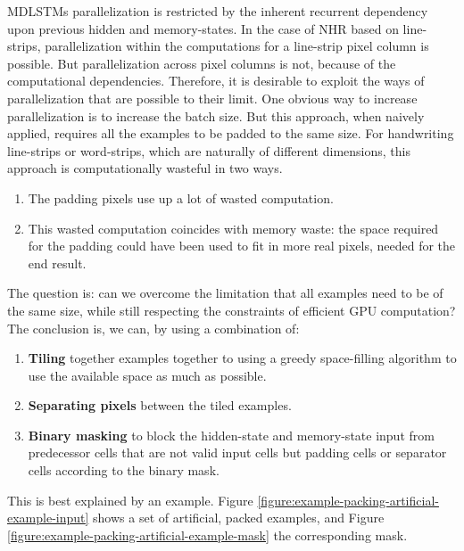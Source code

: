 \documentclass[conference]{IEEEtran}
\renewcommand{\ac}[1]{\gls{#1}}
\renewcommand{\acp}[1]{\glspl{#1}}
\begin{document}
\acp{MDLSTM} parallelization is restricted by the inherent recurrent dependency 
upon previous hidden and memory-states.
In the case of \ac{NHR} based on line-strips, parallelization 
within the computations for a line-strip pixel column is possible. But parallelization 
across pixel columns is not, because of the computational dependencies.
Therefore, it is desirable to exploit the ways of parallelization that are possible to their limit. 
One obvious way to increase parallelization is to increase the batch size.
But this approach, when naively applied, requires all the examples to be 
padded to the same size. For handwriting line-strips or word-strips, which 
are naturally of different dimensions, this approach is computationally 
wasteful in two ways. 
\begin{enumerate}
\item The padding pixels use up a lot of wasted computation. 
\item This  wasted computation coincides with memory waste: 
the space required for the padding could have been used to fit in more real pixels, 
needed for the end result.    
\end{enumerate}

The question is: can we overcome the limitation that all examples need to be of the 
same size, while still respecting the constraints of efficient GPU computation? 
The conclusion is, we can, by using a combination of:

\begin{enumerate}
\item \textbf{Tiling} together examples together to using a greedy space-filling algorithm  to use 
the available space as much as possible.
\item \textbf{Separating pixels} between the tiled examples.
\item \textbf{Binary masking} to block the hidden-state and memory-state input from predecessor cells 
that are not valid input cells but padding cells or separator cells according to the binary mask.    
\end{enumerate}

This is best explained by an example. Figure \ref{figure:example-packing-artificial-example-input} shows 
a set of artificial, packed examples, and Figure \ref{figure:example-packing-artificial-example-mask}
the corresponding mask.
\end{document}
